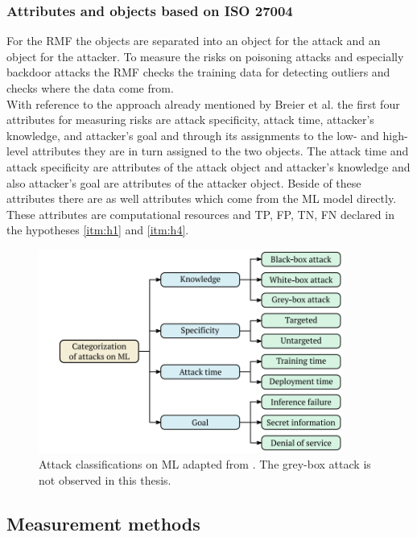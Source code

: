 \subsubsection*{Attributes and objects based on ISO 27004}

For the RMF the objects are separated into an object for the attack and an object for the attacker. To measure the risks on poisoning attacks and especially backdoor attacks the RMF checks the training data for detecting outliers and checks where the data come from. \\ With reference to the approach already mentioned by Breier et al. \cite{DBLP:journals/corr/abs-2012-04884} the first four attributes for measuring risks are attack specificity, attack time, attacker's knowledge, and attacker's goal and through its assignments to the low- and high-level attributes they are in turn assigned to the two objects. The attack time and attack specificity are attributes of the attack object and attacker's knowledge and also attacker's goal are attributes of the attacker object. Beside of these attributes there are as well attributes which come from the ML model directly. These attributes are computational resources and TP, FP, TN, FN declared in the hypotheses \ref{itm:h1} and \ref{itm:h4}.

\begin{figure}[ht!]
  \centering
  \includegraphics[width=10cm]{pictures/classifi_attacks_ml.png}
  \caption{Attack classifications on ML adapted from \cite{DBLP:journals/corr/abs-2012-04884}. The grey-box attack is not observed in this thesis.}
  \label{fig:classifi_attacks_ml}
\end{figure}

\subsection{Measurement methods}


